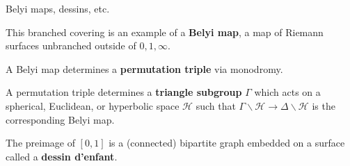 \documentclass{beamer}
\begin{document}
\begin{frame}[plain]{Belyi maps, dessins, etc.}
    \begin{vfilleditems}
        \item This branched covering is an example of a \textbf{Belyi map},
        a map of Riemann surfaces unbranched outside of $0,1,\infty$.
        \item A Belyi map determines a \textbf{permutation triple} via monodromy.
        \item A permutation triple determines a \textbf{triangle subgroup} $\Gamma$
        which acts on a spherical, Euclidean, or hyperbolic space $\mathcal{H}$
        such that $\Gamma \backslash \mathcal{H} \to \Delta \backslash \mathcal{H}$
        is the corresponding Belyi map.
        \item The preimage of $[0,1]$ is a (connected) bipartite graph
        embedded on a surface called a \textbf{dessin d'enfant}.
    \end{vfilleditems}
\end{frame}
\end{document}
